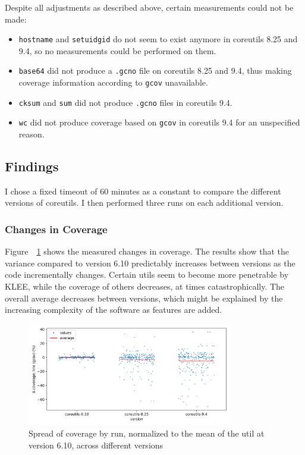 \documentclass{article}
\let\savedRef=\ref
\renewcommand{\ref}{\unskip~\savedRef}
\begin{document}
Despite all adjustments as described above, certain measurements could not be made:
\begin{itemize}
    \item \lstinline{hostname} and \lstinline{setuidgid} do not seem to exist anymore in coreutils 8.25 and 9.4, so no measurements could be performed on them.
    \item \lstinline{base64} did not produce a \lstinline{.gcno} file on coreutils 8.25 and 9.4, thus making coverage information according to \lstinline{gcov} unavailable.
    \item \lstinline{cksum} and \lstinline{sum} did not produce \lstinline{.gcno} files in coreutils 9.4.
    \item \lstinline{wc} did not produce coverage based on \lstinline{gcov} in coreutils 9.4 for an unspecified reason.
\end{itemize}

\subsection{Findings}

I chose a fixed timeout of 60 minutes as a constant to compare the different versions of coreutils. I then performed three runs on each additional version.

\subsubsection{Changes in Coverage}

Figure~\ref{fig:spread_across_versions_gcov} shows the measured changes in coverage. The results show that the variance compared to version 6.10 predictably increases between versions as the code incrementally changes. Certain utils seem to become more penetrable by KLEE, while the coverage of others decreases, at times catastrophically. The overall average decreases between versions, which might be explained by the increasing complexity of the software as features are added.

\begin{figure}[htbp]
    \centering
    \includegraphics[width=0.8\textwidth]{../plots/gcov_cov/changes-by-version.png}
    \captionsetup{width=0.6\textwidth}
    \caption{Spread of coverage by run, normalized to the mean of the util at version 6.10, across different versions}
    \label{fig:spread_across_versions_gcov}
\end{figure}
\end{document}
